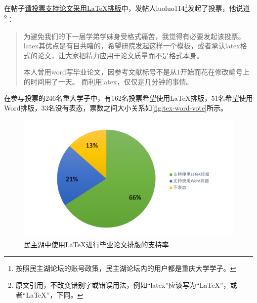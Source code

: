 在帖子\href{http://www.cqumzh.cn/bbs/forum.php?mod=viewthread&tid=830829}{请投票支持论文采用\LaTeX 排版}中，发帖人luoluo114\footnote{按照民主湖论坛的账号政策，民主湖论坛内的用户都是重庆大学学子。}发起了投票，他说道\footnote{原文引用，不改变错别字或错误用法，例如“latex”应该写为“LaTeX”，或者“\LaTeX ”，下同。}：

\begin{quotation}
	为避免我们的下一届学弟学妹身受格式痛苦，我觉得有必要发起该投票。latex其优点是有目共睹的，希望研院发起这样一个模板，或者承认latex格式的论文，让大家把精力应用于论文质量而不是格式本身。
	
	本人曾用word写毕业论文，因参考文献标号不是从1开始而花在修改编号上的时间用了一天。 而利用latex，仅仅是几分钟的事情。
\end{quotation}

在参与投票的246名重大学子中，有162名投票希望使用\LaTeX 排版，51名希望使用Word排版，33名没有表态，票数之间大小关系如\autoref{fig:tex-word-vote}所示。

\begin{figure}[tbh]
\centering
\includegraphics[width=\linewidth]{figures/TeX-Word-Vote}
\caption{民主湖中使用\LaTeX 进行毕业论文排版的支持率}
\label{fig:tex-word-vote}
\end{figure}

